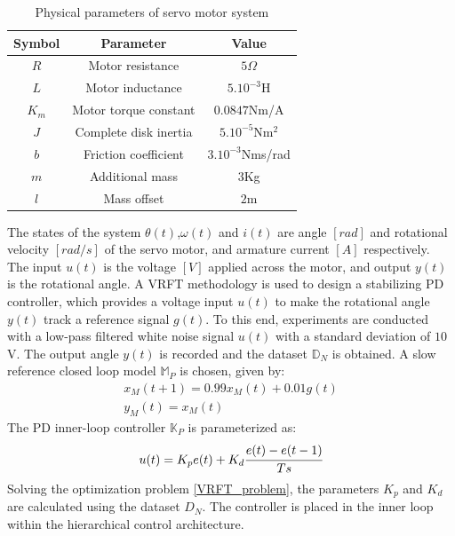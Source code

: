 \documentclass[letterpaper, 10 pt, conference]{ieeeconf}  %
\begin{document}
	\begin{table}[h!]
		\hspace{30pt}
		\begin{tabular}{||c|c|c||} 
			\hline
			Symbol & Parameter & Value\\ [0.5ex] 
			\hline\hline
			$R$ & Motor resistance & $5\Omega$ \\ 
			$L$ & Motor inductance & $5.10^{-3}$H \\
			$K_m$ & Motor torque constant & $0.0847$Nm/A \\
			$J$ & Complete disk inertia & $5.10^{-5}$Nm$^2$ \\
			$b$ & Friction coefficient & $3.10^{-3}$Nms/rad \\
			$m$ & Additional mass & $3$Kg \\
			$l$ & Mass offset & $2$m \\
			\hline
		\end{tabular}
		\caption{Physical parameters of servo motor system}
		\label{Simparam}
	\end{table}
	The states of the system $\theta(t)$,$\omega(t)$ and $i(t)$ are angle $[rad]$ and rotational velocity $[rad/s]$ of the servo motor, and armature current $[A]$ respectively. The input $u(t)$ is the voltage $[V]$ applied across the motor, and output $y(t)$ is the rotational angle. 
	A VRFT methodology is used to design a stabilizing PD controller, which provides a voltage input $u(t)$ to make the rotational angle $y(t)$ track a reference signal $g(t)$. To this end, experiments are conducted with a low-pass filtered white noise signal $u(t)$ with a standard deviation of $10$V. The output angle $y(t)$ is recorded and the dataset $\mathbb{D}_N$ is obtained. A slow reference closed loop model $\mathbb{M}_P$ is chosen, given by:
	\begin{equation*}
	\begin{matrix}
	x_M(t+1) = 0.99x_M(t) + 0.01g(t)\\
	y_M(t) = x_M(t)
	\end{matrix}
	\end{equation*}
	The PD inner-loop controller $\mathbb{K}_P$ is parameterized as:
	\begin{equation*}
	u(t) = K_pe(t) + K_d\cfrac{e(t)-e(t-1)}{Ts}
	\end{equation*} 
	Solving the optimization problem \eqref{VRFT_problem}, the parameters 
	$K_p$ and $K_d$ are calculated using the dataset $D_N$. The controller is placed in the inner loop within the hierarchical control architecture.
\end{document}
